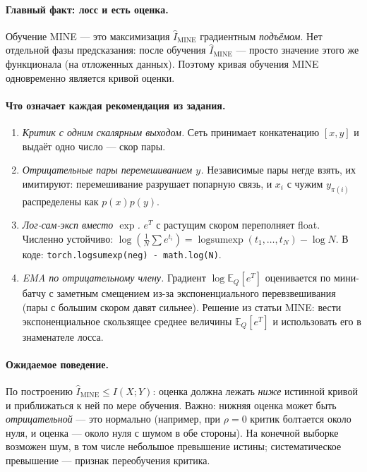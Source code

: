 \documentclass[11pt]{article}
\newcommand{\MI}{I(X;Y)}
\newcommand{\EE}{\mathbb{E}}
\begin{document}
\paragraph{Главный факт: лосс и есть оценка.} Обучение MINE — это максимизация $\hat I_{\text{MINE}}$ градиентным \emph{подъёмом}. Нет отдельной фазы предсказания: после обучения $\hat I_{\text{MINE}}$ — просто значение этого же функционала (на отложенных данных). Поэтому кривая обучения MINE одновременно является кривой оценки.

\paragraph{Что означает каждая рекомендация из задания.}

\begin{enumerate}[label=\arabic*.]
\item \emph{Критик с одним скалярным выходом.} Сеть принимает конкатенацию $[x,y]$ и выдаёт одно число — скор пары.
\item \emph{Отрицательные пары перемешиванием $y$.} Независимые пары негде взять, их имитируют: перемешивание разрушает попарную связь, и $x_i$ с чужим $y_{\pi(i)}$ распределены как $p(x)p(y)$.
\item \emph{Лог-сам-эксп вместо $\exp$.} $e^{T}$ с растущим скором переполняет float. Численно устойчиво: $\log(\frac1N\sum e^{t_i})=\operatorname{logsumexp}(t_1,\dots,t_N)-\log N$. В коде: \texttt{torch.logsumexp(neg) - math.log(N)}.
\item \emph{EMA по отрицательному члену.} Градиент $\log\EE_Q[e^T]$ оценивается по мини-батчу с заметным смещением из-за экспоненциального перевзвешивания (пары с большим скором давят сильнее). Решение из статьи MINE: вести экспоненциальное скользящее среднее величины $\EE_Q[e^T]$ и использовать его в знаменателе лосса.
\end{enumerate}

\paragraph{Ожидаемое поведение.} По построению $\hat I_{\text{MINE}}\le\MI$: оценка должна лежать \emph{ниже} истинной кривой и приближаться к ней по мере обучения. Важно: нижняя оценка может быть \emph{отрицательной} — это нормально (например, при $\rho=0$ критик болтается около нуля, и оценка — около нуля с шумом в обе стороны). На конечной выборке возможен шум, в том числе небольшое превышение истины; систематическое превышение — признак переобучения критика.
\end{document}
